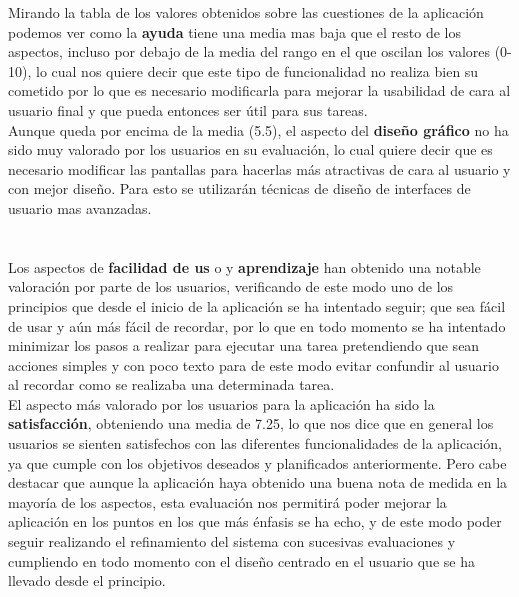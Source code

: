 \documentclass[12pt,letterpaper]{article}
\begin{document}
Mirando la tabla de los valores obtenidos sobre las cuestiones de la aplicación podemos ver como la \textbf{ayuda} tiene una media mas baja que el resto de los aspectos, incluso por debajo de la media del rango en el que oscilan los valores (0-10), lo cual nos quiere decir que este tipo de funcionalidad no realiza bien su cometido por lo que es necesario modificarla para mejorar la usabilidad de cara al usuario final y que pueda entonces ser útil para sus tareas.\\

Aunque queda por encima de la media (5.5), el aspecto del \textbf{diseño gráfico} no ha sido muy valorado por los usuarios en su evaluación, lo cual quiere decir que es necesario modificar las pantallas para hacerlas más atractivas de cara al usuario y con mejor diseño. Para esto se utilizarán técnicas de diseño de interfaces de usuario mas avanzadas.\\\\\\

Los aspectos de  \textbf{facilidad de us} o y  \textbf{aprendizaje} han obtenido una notable valoración por parte de los usuarios, verificando de este modo uno de los principios que desde el inicio de la aplicación se ha intentado seguir; que sea fácil de usar y aún más fácil de recordar, por lo que en todo momento se ha intentado minimizar los pasos a realizar para ejecutar una tarea pretendiendo que sean acciones simples y con poco texto para de este modo evitar confundir al usuario al recordar como se realizaba una determinada tarea.\\

El aspecto más valorado por los usuarios para la aplicación ha sido la \textbf{satisfacción}, obteniendo una media de 7.25, lo que nos dice que en general los usuarios se sienten satisfechos con las diferentes funcionalidades de la aplicación, ya que cumple con los objetivos deseados y planificados anteriormente. Pero cabe destacar que aunque la aplicación haya obtenido una buena nota de medida en la mayoría de los aspectos, esta evaluación nos permitirá poder mejorar la aplicación en los puntos en los que más énfasis se ha echo, y de este modo poder seguir realizando el refinamiento del sistema con sucesivas evaluaciones y cumpliendo en todo momento con el diseño centrado en el usuario que se ha llevado desde el principio.

		
\end{document}
